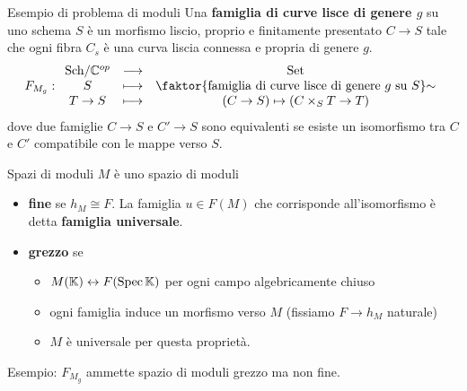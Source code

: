 \documentclass[a4paper]{beamer}
\begin{document}
\begin{frame}{Esempio di problema di moduli}
Una \textbf{famiglia di curve lisce di genere $g$} su uno schema $S$ \`e un morfismo liscio, proprio e finitamente presentato $C\to S$ tale che ogni fibra $C_s$ \`e una curva liscia connessa e propria di genere $g$.
\[F_{M_g}:\functorDef{\Sch\C\op}{\Set}{S}{\quot{\cpa{\text{famiglia di curve lisce di genere $g$ su $S$}}}\sim}{T\to S}{(C\to S)\mapsto (C\times_S T\to T)}\]
dove due famiglie $C\to S$ e $C'\to S$ sono equivalenti se esiste un isomorfismo tra $C$ e $C'$ compatibile con le mappe verso $S$.
\begin{center}
\end{center}
\end{frame}

\begin{frame}{Spazi di moduli}
$M$ \`e uno spazio di moduli\pause
\begin{itemize}
\item \textbf{fine} se $h_M\cong F$. La famiglia $u\in F(M)$ che corrisponde all'isomorfismo \`e detta \textbf{famiglia universale}.\pause
\item \textbf{grezzo} se 
\begin{itemize}
\item $M(\mathbb{K})\leftrightarrow F(\mathrm{Spec}\,\mathbb{K})$ per ogni campo algebricamente chiuso
\item ogni famiglia induce un morfismo verso $M$ (fissiamo $F\to h_M$ naturale)
\item $M$ \`e universale per questa propriet\`a.
\end{itemize}
\end{itemize}
\medskip\pause

Esempio: $F_{M_g}$ ammette spazio di moduli grezzo ma non fine.
\end{frame}
\end{document}
